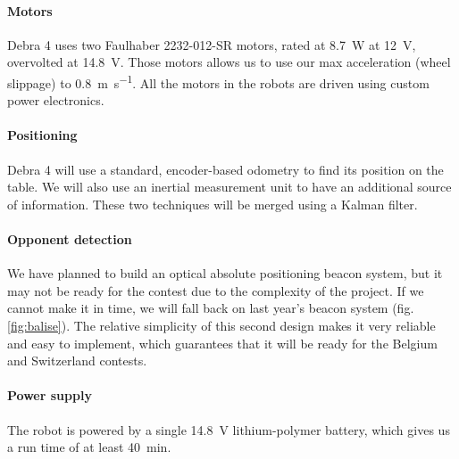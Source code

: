 \documentclass[a4paper]{paper}
\begin{document}
\paragraph{Motors}
Debra 4 uses two Faulhaber 2232-012-SR motors, rated at \SI{8.7}{\watt} at \SI{12}{\volt}, overvolted at \SI{14.8}{\volt}.
Those motors allows us to use our max acceleration (wheel slippage) to \SI{0.8}{\meter\per\second}.
All the motors in the robots are driven using custom power electronics.

\paragraph{Positioning}
Debra 4 will use a standard, encoder-based odometry to find its position on the table.
We will also use an inertial measurement unit to have an additional source of information.
These two techniques will be merged using a Kalman filter.

\paragraph{Opponent detection}
We have planned to build an optical absolute positioning beacon system, but it may not be ready for the contest due to the complexity of the project.
If we cannot make it in time, we will fall back on last year's beacon system (fig. \ref{fig:balise}).
The relative simplicity of this second design makes it very reliable and easy to implement, which guarantees that it will be ready for the Belgium and Switzerland contests.

\paragraph{Power supply}
The robot is powered by a single \SI{14.8}{\volt} lithium-polymer battery, which gives us a run time of at least \SI{40}{\minute}.
\end{document}
